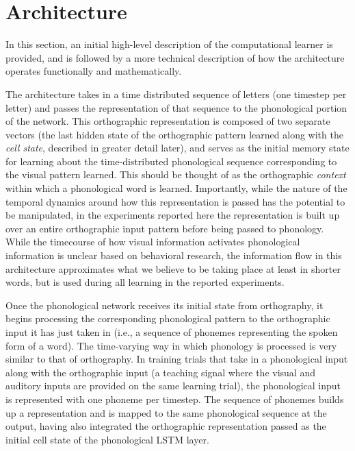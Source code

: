 \documentclass[
  american,
  man,floatsintext]{apa6}
\begin{document}
\hypertarget{architecture}{%
\section{Architecture}\label{architecture}}

In this section, an initial high-level description of the computational learner is provided, and is followed by a more technical description of how the architecture operates functionally and mathematically.

The architecture takes in a time distributed sequence of letters (one timestep per letter) and passes the representation of that sequence to the phonological portion of the network. This orthographic representation is composed of two separate vectors (the last hidden state of the orthographic pattern learned along with the \emph{cell state}, described in greater detail later), and serves as the initial memory state for learning about the time-distributed phonological sequence corresponding to the visual pattern learned. This should be thought of as the orthographic \emph{context} within which a phonological word is learned. Importantly, while the nature of the temporal dynamics around how this representation is passed has the potential to be manipulated, in the experiments reported here the representation is built up over an entire orthographic input pattern before being passed to phonology. While the timecourse of how visual information activates phonological information is unclear based on behavioral research, the information flow in this architecture approximates what we believe to be taking place at least in shorter words, but is used during all learning in the reported experiments.

Once the phonological network receives its initial state from orthography, it begins processing the corresponding phonological pattern to the orthographic input it has just taken in (i.e., a sequence of phonemes representing the spoken form of a word). The time-varying way in which phonology is processed is very similar to that of orthography. In training trials that take in a phonological input along with the orthographic input (a teaching signal where the visual and auditory inputs are provided on the same learning trial), the phonological input is represented with one phoneme per timestep. The sequence of phonemes builds up a representation and is mapped to the same phonological sequence at the output, having also integrated the orthographic representation passed as the initial cell state of the phonological LSTM layer.
\end{document}
